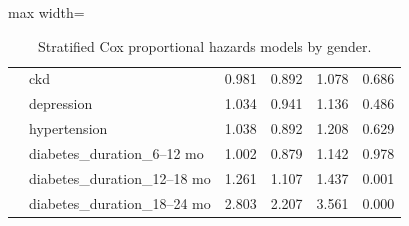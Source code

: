 \documentclass[twoside,11pt]{article}
\begin{document}
\begin{table}[H]
\begin{adjustbox}{max width=\textwidth}
\begin{tabular}{llcccc}
                       & ckd                           & 0.981       & 0.892           & 1.078            & 0.686                       \\
                       & depression                    & 1.034       & 0.941           & 1.136            & 0.486                       \\
                       & hypertension                  & 1.038       & 0.892           & 1.208            & 0.629                       \\
                       & diabetes\_duration\_6--12 mo  & 1.002       & 0.879           & 1.142            & 0.978                       \\
                       & diabetes\_duration\_12--18 mo & 1.261       & 1.107           & 1.437            & \cellcolor{lightgreen}0.001 \\
                       & diabetes\_duration\_18--24 mo & 2.803       & 2.207           & 3.561            & \cellcolor{lightgreen}0.000 \\
      \hline
    \end{tabular}
  \end{adjustbox}
  \caption{Stratified Cox proportional hazards models by gender.}
  \label{tab:gender_stratified}
\end{table}
\end{document}
